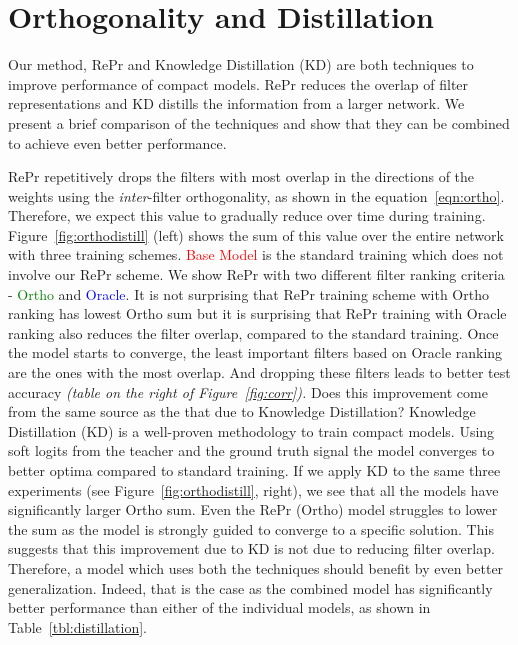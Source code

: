 \section{Orthogonality and Distillation} \label{lbl:distillation}
Our method, RePr and Knowledge Distillation (KD) are both techniques to improve performance of compact models.
RePr reduces the overlap of filter representations and KD distills the information from a larger network. 
We present a brief comparison of the techniques and show that they can be combined to achieve even better performance.

RePr repetitively drops the filters with most overlap in the directions of the weights using the \textit{inter}-filter orthogonality, as shown in the equation~\ref{eqn:ortho}. 
Therefore, we expect this value to gradually reduce over time during training.
Figure~\ref{fig:orthodistill} (left) shows the sum of this value over the entire network with three training schemes.
\textcolor{red}{Base Model} is the standard training which does not involve our RePr scheme.
We show RePr with two different filter ranking criteria - \textcolor{green}{Ortho} and \textcolor{blue}{Oracle}. 
It is not surprising that RePr training scheme with Ortho ranking has lowest Ortho sum but it is surprising that RePr training with Oracle ranking also reduces the filter overlap, compared to the standard training.
Once the model starts to converge, the least important filters based on Oracle ranking are the ones with the most overlap.
And dropping these filters leads to better test accuracy \textit{(table on the right of  Figure~\ref{fig:corr}).}
Does this improvement come from the same source as the that due to Knowledge Distillation?
Knowledge Distillation (KD) is a well-proven methodology to train compact models. 
Using soft logits from the teacher and the ground truth signal the model converges to better optima compared to standard training. 
If we apply KD to the same three experiments (see Figure~\ref{fig:orthodistill}, right), we see that all the models have significantly larger Ortho sum. Even the RePr (Ortho) model struggles to lower the sum as the model is strongly guided to converge to a specific solution.
This suggests that this improvement due to KD is not due to reducing filter overlap. Therefore, a model which uses both the techniques should benefit by even better generalization.
Indeed, that is the case as the combined model has significantly better performance than either of the individual models, as shown in  Table~\ref{tbl:distillation}. 

